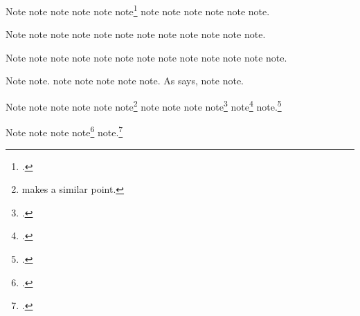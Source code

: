 \documentclass[a4paper,12pt]{report}
\begin{document}
Note\autocite{shapey:partita} note\autocite{sechzer:women}
note\autocite{sirosh:visualcortex} note\autocite{sereny:cries}
note\autocite{silver:gawain}
note\footnote{.}
note\autocite{soltes:georgia} note\autocite{sirosh:visualcortex}
note\autocite{spock:interview} note\autocite{shapey:partita}
note\autocite{stenger:privacy} note\autocite{silver:gawain}.

Note\autocite{tillich:system} note\autocite{soltes:georgia}
note\autocite{spock:interview} note\autocite{times:guide}
note\autocite{twain:audio} note\autocite{virginia:plantation}
note\autocite{stenger:privacy} note\autocite{chicago:manual}
note\autocite{twain:audio} note\autocite[2:45]{tillich:system}
note\autocite[police ranks]{times:guide}
note\autocite{virginia:plantation}.

Note\autocite{chicago:manual} note\autocite{unsigned:ranke}
note\autocite{herwign:office} note\autocite{verdi:corsaro}
note\autocite{wallraff:word} note\autocite{unsigned:ranke}
note\autocite{warr:ellison} note\autocite{herwign:office}
note\autocite{wallraff:word} note\autocite{verdi:corsaro}
note\autocite{wauchope:ceramics} note\autocite{weed:flatiron}
note\autocite{weresz}.

Note\autocite{white:callimachus} note\autocite{white:ross:memo}.
note\autocite{warr:ellison} note\autocite{weed:flatiron}
note\autocite{wikiped:bibtex} note\autocite{will:cohere}
note\autocite{wauchope:ceramics}.  As \textcite{zukowsky:chicago}
says, note\autocite{weresz} note\autocite{white:russ}.

Note\autocite{white:callimachus} note\autocite{white:ross:memo}
note\autocite{white:russ} note\autocite[BibTeX]{wikiped:bibtex}
note\autocite{will:cohere} note\footnote{\textcite{zukowsky:chicago}
  makes a similar point.}
note\autocites[See][3.2.996b5--8]{aristotle:metaphy:gr}[360e--361b]
{plato:republic:gr}[and also][for additional
information]{white:callimachus} note\autocite{aristotle:metaphy:trans}
note\autocites[See][]{mchugh:wake}[and][569]{warr:ellison}
note\footnote{.}
note\footnote{.}
note.\footnote{.}

Note\autocite[3:126]{meredith:letters} note
note\autocite[2]{weresz} note\footnote{.}
note.\footnote{\cite*{zukowsky:chicago}.}

\nocite{furet:passing:fr,house:papers}

\printshorthands

\printbibliography[notkeyword=original]
\end{document}
